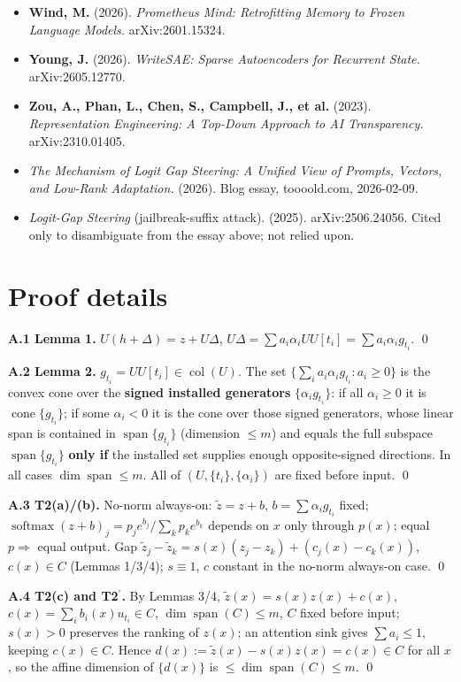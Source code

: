 \documentclass[11pt]{article}
\theoremstyle{plain}
\theoremstyle{definition}
\begin{document}
\begin{itemize}
\item \textbf{Wind, M.} (2026). \emph{Prometheus Mind: Retrofitting Memory to Frozen Language Models.} arXiv:2601.15324.
\item \textbf{Young, J.} (2026). \emph{WriteSAE: Sparse Autoencoders for Recurrent State.} arXiv:2605.12770.
\item \textbf{Zou, A., Phan, L., Chen, S., Campbell, J., et al.} (2023). \emph{Representation Engineering: A Top-Down Approach to AI Transparency.} arXiv:2310.01405.
\item \emph{The Mechanism of Logit Gap Steering: A Unified View of Prompts, Vectors, and Low-Rank Adaptation.} (2026). Blog essay, toooold.com, 2026-02-09.
\item \emph{Logit-Gap Steering} (jailbreak-suffix attack). (2025). arXiv:2506.24056. Cited only to disambiguate from the essay above; not relied upon.
\end{itemize}

\appendix
\section{Proof details}

\textbf{A.1 Lemma 1.} $U(h+\Delta) = z + U\Delta$, $U\Delta = \sum a_i \alpha_i U U[t_i] = \sum a_i \alpha_i g_{t_i}$. \qed

\textbf{A.2 Lemma 2.} $g_{t_i} = U U[t_i] \in \operatorname{col}(U)$. The set $\{\sum_i a_i\alpha_i g_{t_i} : a_i \ge 0\}$ is the convex cone over the \textbf{signed installed generators} $\{\alpha_i g_{t_i}\}$: if all $\alpha_i \ge 0$ it is $\operatorname{cone}\{g_{t_i}\}$; if some $\alpha_i < 0$ it is the cone over those signed generators, whose linear span is contained in $\operatorname{span}\{g_{t_i}\}$ (dimension $\le m$) and equals the full subspace $\operatorname{span}\{g_{t_i}\}$ \textbf{only if} the installed set supplies enough opposite-signed directions. In all cases $\dim \operatorname{span} \le m$. All of $(U,\{t_i\},\{\alpha_i\})$ are fixed before input. \qed

\textbf{A.3 T2(a)/(b).} No-norm always-on: $\tilde z = z + b$, $b = \sum \alpha_i g_{t_i}$ fixed; $\operatorname{softmax}(z+b)_j = p_j e^{b_j}/\sum_k p_k e^{b_k}$ depends on $x$ only through $p(x)$; equal $p \Rightarrow$ equal output. Gap $\tilde z_j-\tilde z_k = s(x)(z_j-z_k)+(c_j(x)-c_k(x))$, $c(x)\in C$ (Lemmas 1/3/4); $s\equiv 1$, $c$ constant in the no-norm always-on case. \qed

\textbf{A.4 T2(c) and T2$^{\prime}$.} By Lemmas 3/4, $\tilde z(x) = s(x)z(x) + c(x)$, $c(x) = \sum_i b_i(x)u_{t_i} \in C$, $\dim \operatorname{span}(C) \le m$, $C$ fixed before input; $s(x)>0$ preserves the ranking of $z(x)$; an attention sink gives $\sum a_i \le 1$, keeping $c(x)\in C$. Hence $d(x) := \tilde z(x)-s(x)z(x) = c(x) \in C$ for all $x$, so the affine dimension of $\{d(x)\}$ is $\le \dim \operatorname{span}(C) \le m$. \qed
\end{document}

